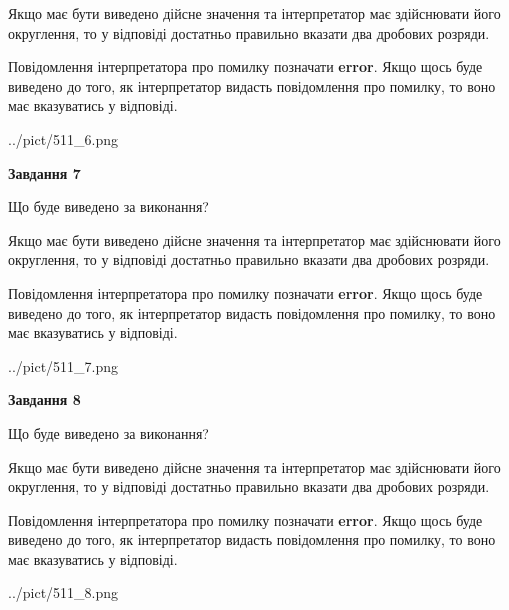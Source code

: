 \documentclass[12pt, ukrainian]{article}
\begin{document}
{\begin {Large}
Якщо має бути виведено дійсне значення та інтерпретатор має здійснювати його округлення, 
то у відповіді достатньо правильно вказати два дробових розряди.

Повідомлення інтерпретатора про помилку позначати \textbf{error}.
Якщо щось буде виведено до того, як інтерпретатор видасть повідомлення про помилку, 
то воно має вказуватись у відповіді. \par

\begin{center}
	{../pict/511_6.png}
\end{center}
\newpage

{\begin {center}\textbf{Завдання 7}\end {center}}\par
Що буде виведено за виконання? \par

Якщо має бути виведено дійсне значення та інтерпретатор має здійснювати його округлення, 
то у відповіді достатньо правильно вказати два дробових розряди.

Повідомлення інтерпретатора про помилку позначати \textbf{error}.
Якщо щось буде виведено до того, як інтерпретатор видасть повідомлення про помилку, 
то воно має вказуватись у відповіді. \par

\begin{center}
	{../pict/511_7.png}
\end{center}
\newpage

{\begin {center}\textbf{Завдання 8}\end {center}}\par
Що буде виведено за виконання? \par

Якщо має бути виведено дійсне значення та інтерпретатор має здійснювати його округлення, 
то у відповіді достатньо правильно вказати два дробових розряди.

Повідомлення інтерпретатора про помилку позначати \textbf{error}.
Якщо щось буде виведено до того, як інтерпретатор видасть повідомлення про помилку, 
то воно має вказуватись у відповіді. \par

\begin{center}
	{../pict/511_8.png}
\end{center}
\newpage


\end{Large}}
\end{document}
